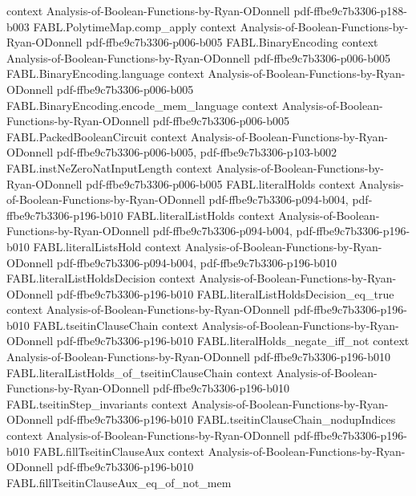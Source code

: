 \begin{theorem}
  {context}
  {Analysis-of-Boolean-Functions-by-Ryan-ODonnell}
  {pdf-ffbe9c7b3306-p188-b003}
\proofstep
  {FABL.PolytimeMap.comp_apply}
  {context}
  {Analysis-of-Boolean-Functions-by-Ryan-ODonnell}
  {pdf-ffbe9c7b3306-p006-b005}
\proofstep
  {FABL.BinaryEncoding}
  {context}
  {Analysis-of-Boolean-Functions-by-Ryan-ODonnell}
  {pdf-ffbe9c7b3306-p006-b005}
\proofstep
  {FABL.BinaryEncoding.language}
  {context}
  {Analysis-of-Boolean-Functions-by-Ryan-ODonnell}
  {pdf-ffbe9c7b3306-p006-b005}
\proofstep
  {FABL.BinaryEncoding.encode_mem_language}
  {context}
  {Analysis-of-Boolean-Functions-by-Ryan-ODonnell}
  {pdf-ffbe9c7b3306-p006-b005}
\proofstep
  {FABL.PackedBooleanCircuit}
  {context}
  {Analysis-of-Boolean-Functions-by-Ryan-ODonnell}
  {pdf-ffbe9c7b3306-p006-b005,
    pdf-ffbe9c7b3306-p103-b002}
\proofstep
  {FABL.instNeZeroNatInputLength}
  {context}
  {Analysis-of-Boolean-Functions-by-Ryan-ODonnell}
  {pdf-ffbe9c7b3306-p006-b005}
\proofstep
  {FABL.literalHolds}
  {context}
  {Analysis-of-Boolean-Functions-by-Ryan-ODonnell}
  {pdf-ffbe9c7b3306-p094-b004,
    pdf-ffbe9c7b3306-p196-b010}
\proofstep
  {FABL.literalListHolds}
  {context}
  {Analysis-of-Boolean-Functions-by-Ryan-ODonnell}
  {pdf-ffbe9c7b3306-p094-b004,
    pdf-ffbe9c7b3306-p196-b010}
\proofstep
  {FABL.literalListsHold}
  {context}
  {Analysis-of-Boolean-Functions-by-Ryan-ODonnell}
  {pdf-ffbe9c7b3306-p094-b004,
    pdf-ffbe9c7b3306-p196-b010}
\proofstep
  {FABL.literalListHoldsDecision}
  {context}
  {Analysis-of-Boolean-Functions-by-Ryan-ODonnell}
  {pdf-ffbe9c7b3306-p196-b010}
\proofstep
  {FABL.literalListHoldsDecision_eq_true}
  {context}
  {Analysis-of-Boolean-Functions-by-Ryan-ODonnell}
  {pdf-ffbe9c7b3306-p196-b010}
\proofstep
  {FABL.tseitinClauseChain}
  {context}
  {Analysis-of-Boolean-Functions-by-Ryan-ODonnell}
  {pdf-ffbe9c7b3306-p196-b010}
\proofstep
  {FABL.literalHolds_negate_iff_not}
  {context}
  {Analysis-of-Boolean-Functions-by-Ryan-ODonnell}
  {pdf-ffbe9c7b3306-p196-b010}
\proofstep
  {FABL.literalListHolds_of_tseitinClauseChain}
  {context}
  {Analysis-of-Boolean-Functions-by-Ryan-ODonnell}
  {pdf-ffbe9c7b3306-p196-b010}
\proofstep
  {FABL.tseitinStep_invariants}
  {context}
  {Analysis-of-Boolean-Functions-by-Ryan-ODonnell}
  {pdf-ffbe9c7b3306-p196-b010}
\proofstep
  {FABL.tseitinClauseChain_nodupIndices}
  {context}
  {Analysis-of-Boolean-Functions-by-Ryan-ODonnell}
  {pdf-ffbe9c7b3306-p196-b010}
\proofstep
  {FABL.fillTseitinClauseAux}
  {context}
  {Analysis-of-Boolean-Functions-by-Ryan-ODonnell}
  {pdf-ffbe9c7b3306-p196-b010}
\proofstep
  {FABL.fillTseitinClauseAux_eq_of_not_mem}

\end{theorem}
